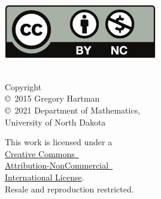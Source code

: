 \begin{minipage}[t]{2in}\mbox{}\\
\href{http://creativecommons.org/licenses/by-nc/4.0/}{\includegraphics{figures/raw/by-nc}}
\end{minipage}%
\begin{minipage}[t]{.5\linewidth}\raggedright\mbox{}\\
\noindent Copyright\\
\copyright~2015 Gregory Hartman\\
\copyright~2021 Department of Mathematics,\\
University of North Dakota\medskip

\noindent
This work is licensed under a\iflatexml\ \else\\\fi \href{http://creativecommons.org/licenses/by-nc/4.0/}{Creative Commons\iflatexml\ \else\\\fi
Attribution-NonCommercial\iflatexml\ \else\\ International License}.\\
Resale and reproduction restricted.
\end{minipage}

\restoregeometry
